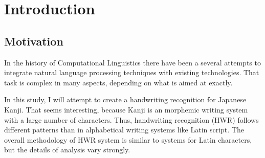 
\chapter{Introduction}
\label{chap:introduction}
\pagestyle{headings} %

\section{Motivation}
\label{sec:intro:motivation}





In the history of Computational Linguistics there have been a several 
attempts to integrate natural language processing techniques with 
existing technologies. That task is complex in many aspects, depending on what is
aimed at exactly.

In this study, I will attempt to create a handwriting recognition for Japanese 
Kanji. That seems interesting, because Kanji is an morphemic writing system
with a large number of characters. Thus, handwriting recognition (HWR) follows 
different patterns than in alphabetical writing systems like Latin script.
The overall methodology of HWR system is similar to systems for Latin characters,
but the details of analysis vary strongly.

